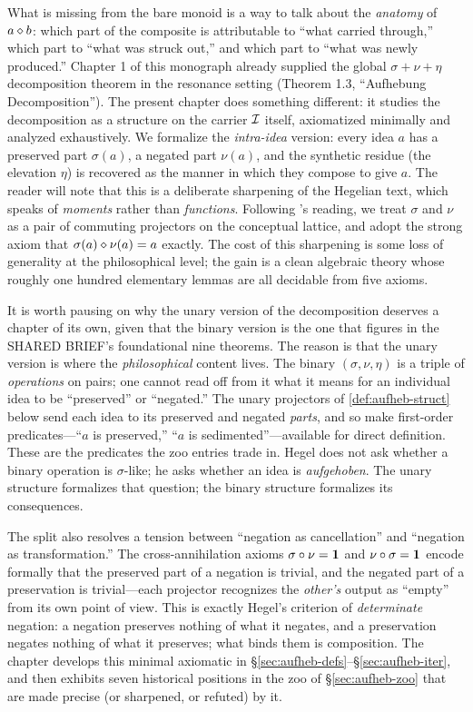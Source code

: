 What is missing from the bare monoid is a way to talk about the
\emph{anatomy} of $a\mathbin{\diamond} b$: which part of the composite is
attributable to ``what carried through,'' which part to ``what was
struck out,'' and which part to ``what was newly produced.'' Chapter 1
of this monograph already supplied the global $\sigma+\nu+\eta$
decomposition theorem in the resonance setting (Theorem 1.3,
``Aufhebung Decomposition''). The present chapter does something
different: it studies the decomposition as a structure on the carrier
$\mathcal{I}$ itself, axiomatized minimally and analyzed exhaustively. We
formalize the \emph{intra-idea} version: every idea $a$ has a
preserved part $\sigma(a)$, a negated part $\nu(a)$, and the synthetic
residue (the elevation $\eta$) is recovered as the manner in which
they compose to give $a$. The reader will note that this is a
deliberate sharpening of the Hegelian text, which speaks of
\emph{moments} rather than \emph{functions}. Following
\citet{Brandom1994}'s reading, we treat $\sigma$ and $\nu$ as a pair
of commuting projectors on the conceptual lattice, and adopt the
strong axiom that $\sigma(a)\mathbin{\diamond}\nu(a)=a$ exactly. The cost of
this sharpening is some loss of generality at the philosophical level;
the gain is a clean algebraic theory whose roughly one hundred
elementary lemmas are all decidable from five axioms.

It is worth pausing on why the unary version of the decomposition
deserves a chapter of its own, given that the binary version is the
one that figures in the SHARED BRIEF's foundational nine theorems.
The reason is that the unary version is where the \emph{philosophical}
content lives. The binary $(\sigma,\nu,\eta)$ is a triple of
\emph{operations} on pairs; one cannot read off from it what it
means for an individual idea to be ``preserved'' or ``negated.'' The
unary projectors of \cref{def:aufheb-struct} below send each idea to
its preserved and negated \emph{parts}, and so make first-order
predicates---``$a$ is preserved,'' ``$a$ is sedimented''---available
for direct definition. These are the predicates the zoo entries
trade in. Hegel does not ask whether a binary operation is
$\sigma$-like; he asks whether an idea is \emph{aufgehoben}. The
unary structure formalizes that question; the binary structure
formalizes its consequences.

The split also resolves a tension between ``negation as cancellation''
and ``negation as transformation.'' The cross-annihilation axioms
$\sigma\circ\nu=\mathbf{1}$ and $\nu\circ\sigma=\mathbf{1}$ encode formally
that the preserved part of a negation is trivial, and the negated
part of a preservation is trivial---each projector recognizes the
\emph{other's} output as ``empty'' from its own point of view. This is
exactly Hegel's criterion of \emph{determinate} negation: a negation
preserves nothing of what it negates, and a preservation negates
nothing of what it preserves; what binds them is composition. The
chapter develops this minimal axiomatic in
\S\ref{sec:aufheb-defs}--\S\ref{sec:aufheb-iter}, and then exhibits
seven historical positions in the zoo of \S\ref{sec:aufheb-zoo} that
are made precise (or sharpened, or refuted) by it.

